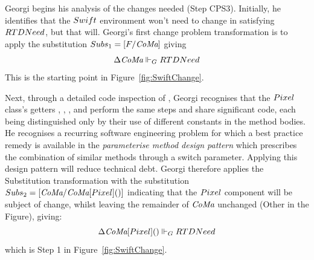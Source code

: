 \documentclass[runningheads,a4paper]{llncs}
\begin{document}
\newcommand\GeorgiStepZero{[\Java,\ColourMaker{}]\Delta \ColourMaker\meets_G RTDNeed}
\newcommand{\GeorgiStepOne}{[\Java,\ColourMaker{}]\Delta \ColourMaker{}[\CM]()\meets_G RTDNeed}
\newcommand{\GeorgiStepTwo}{[\Java,\ColourMaker{}]\Delta \ColourMaker{}[\CM[\cancel R,\cancel G,\cancel B,\cancel \alpha,](\alpha RGB)]()\meets_G RTDNeed}
\newcommand{\SubsThree}{[\CM/\CM[\cancel R,\cancel G,\cancel B, \cancel\alpha](\alpha RGB)]}
\newcommand{\GeorgiStepThree}{\begin{array}{ll}[\Java,\ColourMaker{}]\Delta \ColourMaker{}[\CM[R\replacedBy R',G\replacedBy G',\\
\qquad\qquad\qquad B\replacedBy B', \alpha\replacedBy\alpha'](\alpha RGB)]()\meets_G RTDNeed\end{array}}

\begin{example}\label{ex:two}
Georgi begins his analysis of the changes needed (Step CPS3). Initially, he identifies that the $Swift$ environment won't need to change in satisfying $RTDNeed$, but that \ColourMaker{} will. Georgi's first change problem transformation is to apply the substitution $Subs_1=[F/\textit{CoMa}]$ giving
%
\begin{equation}
\GeorgiStepZero
\label{eqn:backtrack}	
\end{equation}
%
This is the starting point in Figure~\ref{fig:SwiftChange}.

Next, through a detailed code inspection of \ColourMaker, Georgi recognises that the $Pixel$ class's getters , , , and  perform the same steps and share significant code, each being distinguished only by their use of different constants in the method bodies. He recognises a recurring software engineering problem for which a best practice remedy is available in the \textit{parameterise method design pattern} \cite{1999:RID:311424} which prescribes the combination of similar methods through a switch parameter. Applying this design pattern will reduce technical debt. Georgi therefore applies the {\sc Substitution} transformation with the substitution $Subs_2=[\textit{CoMa}/\textit{CoMa}[Pixel]()]$ indicating that the $Pixel$ component will be subject of change, whilst leaving the remainder of $\textit{CoMa}$ unchanged ({\sf Other} in the Figure), giving:
%
\begin{equation}
\GeorgiStepOne
\label{eqn:backtrack2}	
\end{equation}
%
which is Step 1 in Figure~\ref{fig:SwiftChange}.


\end{example}
\end{document}
